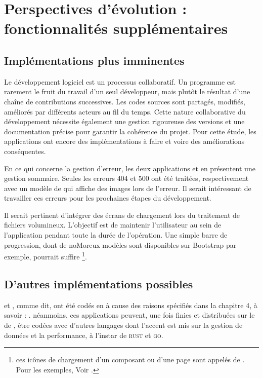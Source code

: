         
\chapter{Perspectives d'évolution : fonctionnalités supplémentaires}
    \section{Implémentations plus imminentes}

    Le développement logiciel est un processus collaboratif. Un programme est rarement le fruit du travail d'un seul développeur, mais plutôt le résultat d'une chaîne de contributions successives. Les codes sources sont partagés, modifiés, améliorés par différents acteurs au fil du temps. Cette nature collaborative du développement nécessite également une gestion rigoureuse des versions et une documentation précise pour garantir la cohérence du projet. Pour cette étude, les applications ont encore des implémentations à faire et voire des améliorations conséquentes.
    
    En ce qui concerne la gestion d'erreur, les deux applications \cvt et \msh en présentent une gestion sommaire. Seules les erreurs 404 et 500 ont été traitées, respectivement avec un modèle de  qui affiche des images lors de l'erreur. Il serait intéressant de travailler ces erreurs pour les prochaines étapes du développement.

    Il serait pertinent d'intégrer des écrans de chargement lors du traitement de fichiers volumineux. L'objectif est de maintenir l'utilisateur au sein de l'application pendant toute la durée de l'opération. Une simple barre de progression, dont de noMoreux modèles sont disponibles sur Bootstrap par exemple, pourrait suffire \footnote{ces icônes de chargement d'un composant ou d'une page sont appelés de . Pour les exemples, Voir \cite{bootstrapspinners}.}.
    
    \section{D'autres implémentations possibles}
    \cvt et \msh, comme dit, ont été codés en \py à cause des raisons spécifiés dans la chapitre 4, à savoir : . néanmoins, ces applications peuvent, une fois finies et distribuées sur le  de \dsc, être codées avec d'autres langages dont l'accent est mis sur la gestion de données et la performance, à l'instar de \textsc{rust} et \textsc{go}. 

